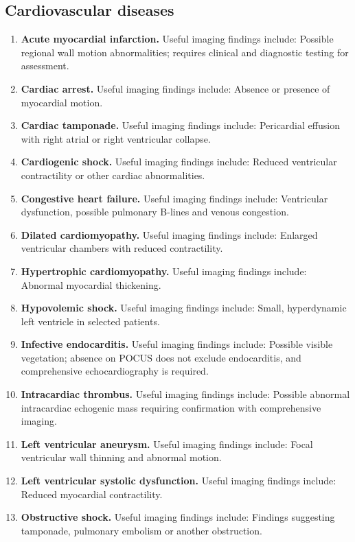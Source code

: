 \subsection{Cardiovascular diseases}
\begin{enumerate}[leftmargin=*,itemsep=0.45em,topsep=0.4em]
\item \textbf{Acute myocardial infarction.} Useful imaging findings include: Possible regional wall motion abnormalities; requires clinical and diagnostic testing for assessment.
\item \textbf{Cardiac arrest.} Useful imaging findings include: Absence or presence of myocardial motion.
\item \textbf{Cardiac tamponade.} Useful imaging findings include: Pericardial effusion with right atrial or right ventricular collapse.
\item \textbf{Cardiogenic shock.} Useful imaging findings include: Reduced ventricular contractility or other cardiac abnormalities.
\item \textbf{Congestive heart failure.} Useful imaging findings include: Ventricular dysfunction, possible pulmonary B-lines and venous congestion.
\item \textbf{Dilated cardiomyopathy.} Useful imaging findings include: Enlarged ventricular chambers with reduced contractility.
\item \textbf{Hypertrophic cardiomyopathy.} Useful imaging findings include: Abnormal myocardial thickening.
\item \textbf{Hypovolemic shock.} Useful imaging findings include: Small, hyperdynamic left ventricle in selected patients.
\item \textbf{Infective endocarditis.} Useful imaging findings include: Possible visible vegetation; absence on POCUS does not exclude endocarditis, and comprehensive echocardiography is required.
\item \textbf{Intracardiac thrombus.} Useful imaging findings include: Possible abnormal intracardiac echogenic mass requiring confirmation with comprehensive imaging.
\item \textbf{Left ventricular aneurysm.} Useful imaging findings include: Focal ventricular wall thinning and abnormal motion.
\item \textbf{Left ventricular systolic dysfunction.} Useful imaging findings include: Reduced myocardial contractility.
\item \textbf{Obstructive shock.} Useful imaging findings include: Findings suggesting tamponade, pulmonary embolism or another obstruction.

\end{enumerate}
